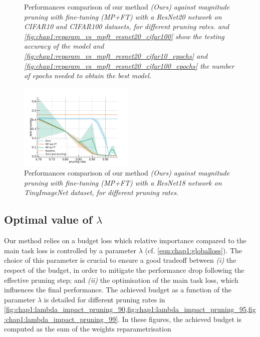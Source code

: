 \begin{figure}
  \caption{ Performances comparison of our method \em{(Ours)} against
  magnitude pruning with fine-tuning \em{(MP+FT)} with a ResNet20 network on
  CIFAR10 and CIFAR100 datasets, for different pruning rates.
   and
  \cref{fig:chap1:reparam_vs_mpft_resnet20_cifar100} show the
  testing accuracy of the model and
  \cref{fig:chap1:reparam_vs_mpft_resnet20_cifar10_epochs} and
  \cref{fig:chap1:reparam_vs_mpft_resnet20_cifar100_epochs}
  the number of epochs needed to obtain the best model.}
  \label{fig:chap1:reparam_vs_mpft_resnet20}
\end{figure}


\begin{figure}
  \centering
  \includegraphics[width=0.49\textwidth]{chapter_1/assets/reparam_vs_mpft_PrunableResNet18_tinyimagenet.pdf}
  \caption{Performances comparison of our method \em{(Ours)} against
  magnitude pruning with fine-tuning \em{(MP+FT)} with a ResNet18 network on
  TinyImageNet dataset, for different pruning rates.}
  \label{fig:chap1:reparam_vs_mpft_resnet18}
\end{figure}



\subsection{Optimal value of \texorpdfstring{$\lambda$}{Lambda}}
\label{sec:chap1:impact_of_lambda}


Our method relies on a budget loss which relative importance compared to the
main task loss is controlled by a parameter $\lambda$ (cf.
\cref{eqn:chap1:globalloss}). The choice of this parameter is crucial to ensure
a good tradeoff between \emph{(i)} the respect of the budget, in order to
mitigate the performance drop following the effective pruning step; and
\emph{(ii)} the optimisation of the main task loss, which influences the final
performance. The achieved budget as a function of the parameter $\lambda$ is
detailed for different pruning rates in
\cref{fig:chap1:lambda_impact_pruning_90,fig:chap1:lambda_impact_pruning_95,fig:chap1:lambda_impact_pruning_99}.
In these figures, the achieved budget is computed as the sum of the weights reparametrisation\\

